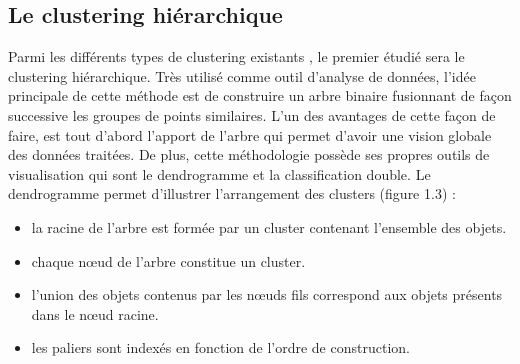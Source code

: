 \documentclass[memoire.tex]{subfiles}
\begin{document}
\subsection{Le clustering hiérarchique}
Parmi les différents types de clustering existants \cite{ref4}, le premier étudié sera le clustering hiérarchique. Très utilisé comme outil d'analyse de données, l'idée principale de cette méthode est de construire un arbre binaire fusionnant de façon successive les groupes de points similaires. L'un des avantages de cette façon de faire,  est tout d'abord l'apport de l'arbre qui permet d'avoir une vision globale des données traitées. De plus, cette méthodologie possède ses propres outils de visualisation qui sont le dendrogramme et la classification double. Le dendrogramme permet d'illustrer l'arrangement des clusters (figure 1.3)\cite{ref8} :
\begin{itemize}
\item la racine de l'arbre est formée par un cluster contenant l'ensemble des objets.
\item chaque nœud de l'arbre constitue un cluster.
\item l'union des objets contenus par les nœuds fils correspond aux objets présents dans le nœud racine.
\item les paliers sont indexés en fonction de l'ordre de construction.
\end{itemize}
\end{document}
